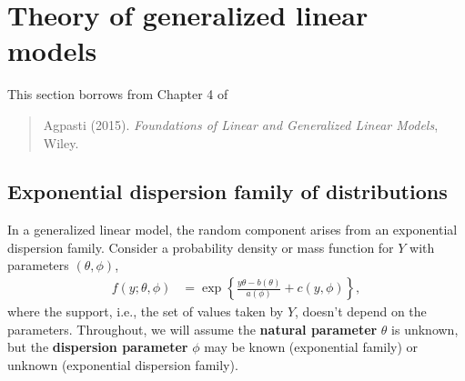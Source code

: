 \documentclass[
  11pt,
  letterpaper,
]{book}
\theoremstyle{definition}
\theoremstyle{definition}
\theoremstyle{definition}
\theoremstyle{remark}
\begin{document}
\hypertarget{theory-of-generalized-linear-models}{%
\section{Theory of generalized linear models}\label{theory-of-generalized-linear-models}}

This section borrows from Chapter 4 of

\begin{quote}
Agpasti (2015). \emph{Foundations of Linear and Generalized Linear Models}, Wiley.
\end{quote}

\hypertarget{exponential-dispersion-family-of-distributions}{%
\subsection{Exponential dispersion family of distributions}\label{exponential-dispersion-family-of-distributions}}

In a generalized linear model, the random component arises from an exponential dispersion family. Consider a probability density or mass function for \(Y\) with parameters \((\theta, \phi)\),
\begin{align}
f(y; \theta, \phi)&= \exp \left\{  \frac{y \theta -b(\theta)}{a(\phi)} + c(y,
\phi)\right\}, \label{eq:expofam}
\end{align}
where the support, i.e., the set of values taken by \(Y\), doesn't depend on the parameters. Throughout, we will assume the \textbf{natural parameter} \(\theta\) is unknown, but the \textbf{dispersion parameter} \(\phi\) may be known (exponential family) or unknown (exponential dispersion family).
\end{document}
